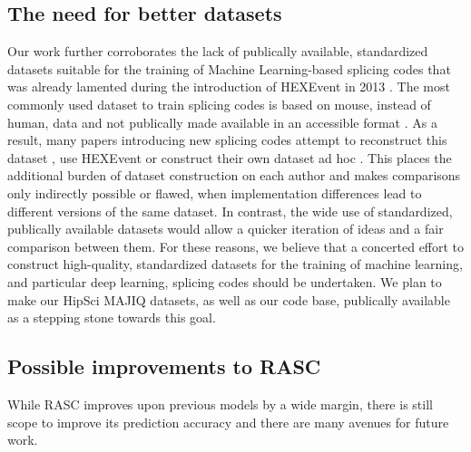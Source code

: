\subsection{The need for better datasets}
Our work further corroborates 
the lack of publically available, standardized datasets suitable for the training of Machine Learning-based splicing codes that was already lamented during the introduction of HEXEvent in 2013 \cite{hexevent}. %
The most commonly used dataset to train splicing codes is based on mouse, instead of human, data and not publically made available in an accessible format \cite{jha}. As a result, many papers introducing new splicing codes attempt to reconstruct this dataset \cite{d2vsplicing}, use HEXEvent \cite{dsc} or construct their own dataset ad hoc \cite{cossmo}. This places the additional burden of dataset construction on each author and makes comparisons only indirectly possible or flawed, when implementation differences lead to different versions of the same dataset. %
In contrast, the wide use of standardized, publically available datasets would allow a quicker iteration of ideas and a fair comparison between them. 
For these reasons, we believe that a concerted effort to construct high-quality, standardized datasets for the training of machine learning, and particular deep learning, splicing codes should be undertaken. We plan to make our HipSci MAJIQ datasets, as well as our code base, publically available as a stepping stone towards this goal.

\subsection{Possible improvements to RASC}
While RASC improves upon previous models by a wide margin, there is still scope to improve its prediction accuracy and there are many avenues for future work. 

